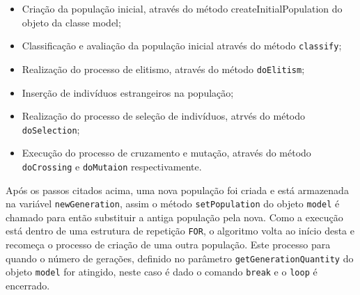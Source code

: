\begin{itemize}
	\begin{itemize}
		\item	Criação da população inicial, através do método createInitialPopulation
		do objeto da classe model;
		
		\item Classificação e avaliação da população inicial através do método
		\texttt{classify};
		
		\item Realização do processo de elitismo, através do método
		\texttt{doElitism};
		
		\item Inserção de indivíduos estrangeiros na população;
		
		\item Realização do processo de seleção de indivíduos, atrvés do método
		\texttt{doSelection};
		
		\item Execução do processo de cruzamento e mutação, através do método
		\texttt{doCrossing} e \texttt{doMutaion} respectivamente.
		
		
	\end{itemize}
	
	\par Após os passos citados acima, uma nova população foi criada e está
	armazenada na variável \texttt{newGeneration}, assim o método
	\texttt{setPopulation} do objeto \texttt{model} é chamado para então substituir
	a antiga população pela nova. Como a execução está dentro de uma estrutura de repetição
	\texttt{FOR}, o algoritmo volta ao início desta e recomeça o processo de
	criação de uma outra população. Este processo para quando o número de gerações, 
	definido no parâmetro \texttt{getGenerationQuantity} do objeto \texttt{model}
	for atingido, neste caso é dado o comando \texttt{break} e o \texttt{loop} é encerrado.
	
	
	
	
\end{itemize}

